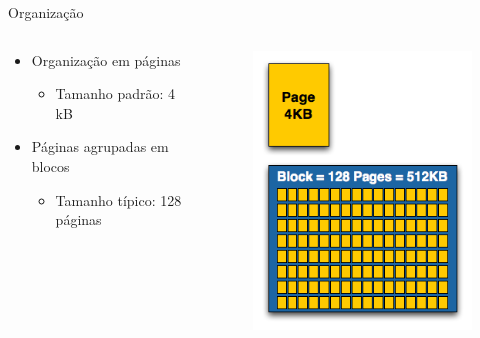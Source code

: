\documentclass[aspectratio=169,
				xcolor=table]{beamer}
\begin{document}
	\begin{frame}{Organização}
		\begin{columns}
			\begin{column}{0.5\textwidth}
				\begin{itemize}
					\item Organização em páginas
					\begin{itemize}
						\item Tamanho padrão: 4 kB
					\end{itemize}
					\vspace{1em}
					\item Páginas agrupadas em blocos
					\begin{itemize}
						\item Tamanho típico: 128 páginas
					\end{itemize}
				\end{itemize}			
			\end{column}
			\begin{column}{0.5\textwidth}
				\begin{figure}[hbtp]
				\centering
				\includegraphics[height=0.8\textheight, keepaspectratio]{../figs/cap08/pageandblock.png}
				\end{figure}
			\end{column}
		\end{columns}

	\end{frame}
	
\end{document}
